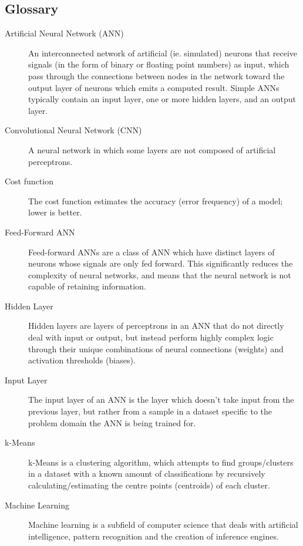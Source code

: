 \documentclass[]{report}
\begin{document}
\subsection{Glossary}
\begin{description}
\item[Artificial Neural Network (ANN)] An interconnected network of artificial (ie. simulated) neurons that receive signals (in the form of binary or floating point numbers) as input, which pass through the connections between nodes in the network toward the output layer of neurons which emits a computed result. Simple ANNs typically contain an input layer, one or more hidden layers, and an output layer.

\item[Convolutional Neural Network (CNN)] A neural network in which some layers are not composed of artificial perceptrons.

\item[Cost function] The cost function estimates the accuracy (error frequency) of a model; lower is better.

\item[Feed-Forward ANN] Feed-forward ANNs are a class of ANN which have distinct layers of neurons whose signals are only fed forward. This significantly reduces the complexity of neural networks, and means that the neural network is not capable of retaining information.

\item[Hidden Layer] Hidden layers are layers of perceptrons in an ANN that do not directly deal with input or output, but instead perform highly complex logic through their unique combinations of neural connections (weights) and activation thresholds (biases).

\item[Input Layer] The input layer of an ANN is the layer which doesn't take input from the previous layer, but rather from a sample in a dataset specific to the problem domain the ANN is being trained for.

\item[k-Means] k-Means is a clustering algorithm, which attempts to find groups/clusters in a dataset with a known amount of classifications by recursively calculating/estimating the centre points (centroids) of each cluster.

\item[Machine Learning] Machine learning is a subfield of computer science that deals with artificial intelligence, pattern recognition and the creation of inference engines.


\end{description}
\end{document}

